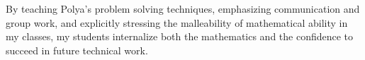 \documentclass[12pt]{article}
\begin{document}
By teaching Polya's problem solving techniques, emphasizing communication and group work, and explicitly stressing the malleability of mathematical ability in my classes, my students internalize both the mathematics and the confidence to succeed in future technical work.  

\end{document}
